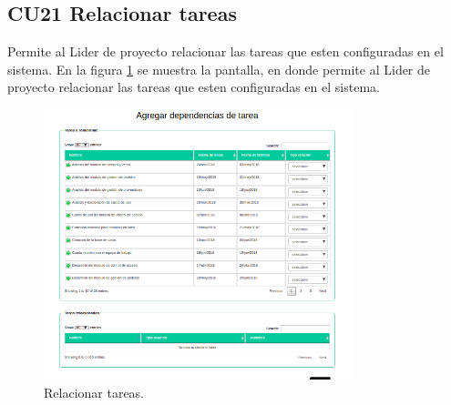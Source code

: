 \subsection{CU21 Relacionar tareas}
{
\justify
{}
}

\justify
Permite al Lider de proyecto relacionar las tareas que esten configuradas en el sistema.
{
\justify
{}
}
\justify
En la figura \ref{fig:IU21} se muestra la pantalla, en donde permite al Lider de proyecto relacionar las tareas que esten configuradas en el sistema.

\begin{figure}[htb]
\centering
\includegraphics[width=0.8\textwidth]{./images/cu21-relacionar-tareas.png}
\caption{Relacionar tareas.} \label{fig:IU21}
\end{figure}